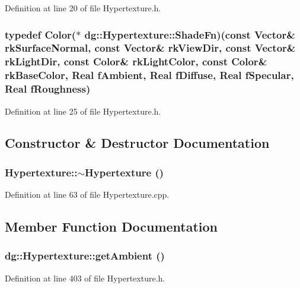 Definition at line 20 of file Hypertexture.h.
\subsubsection{\setlength{\rightskip}{0pt plus 5cm}typedef {\bf Color}($\ast$ dg::Hypertexture::Shade\-Fn)(const {\bf Vector}\& rk\-Surface\-Normal, const {\bf Vector}\& rk\-View\-Dir, const {\bf Vector}\& rk\-Light\-Dir, const {\bf Color}\& rk\-Light\-Color, const {\bf Color}\& rk\-Base\-Color, {\bf Real} f\-Ambient, {\bf Real} f\-Diffuse, {\bf Real} f\-Specular, {\bf Real} f\-Roughness)}\label{classdg_1_1Hypertexture_s4}




Definition at line 25 of file Hypertexture.h.

\subsection{Constructor \& Destructor Documentation}
\subsubsection{\setlength{\rightskip}{0pt plus 5cm}Hypertexture::$\sim$Hypertexture ()}\label{classdg_1_1Hypertexture_a1}




Definition at line 63 of file Hypertexture.cpp.

\subsection{Member Function Documentation}
\subsubsection{ dg::Hypertexture::get\-Ambient ()\hspace{0.3cm}{\tt  [inline]}}\label{classdg_1_1Hypertexture_a15}




Definition at line 403 of file Hypertexture.h.
